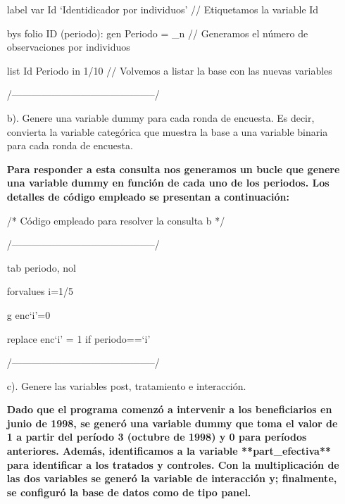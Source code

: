\documentclass[12pt]{article}
\begin{document}
\begin{enumerate}
\begin{statacode}
label var Id `Identidicador por individuos' // Etiquetamos la variable Id

bys folio ID (periodo): gen Periodo = \_n   // Generamos el número de observaciones por individuos

list  Id Periodo in 1/10 // Volvemos a listar la base con las nuevas variables

/--------------------------------------------/
\end{statacode}
 
\begin{stlog}\end{stlog}

\vspace{0.5cm}
\item [b).] Genere una variable dummy para cada ronda de encuesta. Es decir, convierta la variable categórica que muestra la base a una variable binaria para cada ronda de encuesta. 

\textbf{Para responder a esta consulta nos generamos un bucle que genere una variable dummy en función de cada uno de los periodos. Los detalles de código empleado se presentan a continuación: }

\begin{statacode}
/* Código empleado para resolver la consulta b */ 

/--------------------------------------------/


tab periodo, nol

forvalues i=1/5 {
    
    g enc`i'=0
	
	replace enc`i' = 1 if periodo==`i'
	
}



/--------------------------------------------/
\end{statacode}
 


\item [c).] Genere las variables post, tratamiento e interacción. 

\textbf{Dado que el programa comenzó a intervenir a los beneficiarios en junio de 1998, se generó una variable dummy que toma el valor de 1 a partir del período 3 (octubre de 1998) y 0 para períodos anteriores. Además, identificamos a la variable **part\_efectiva** para identificar a los tratados y controles. Con la multiplicación de las dos variables se generó la variable de interacción y; finalmente, se configuró la base de datos como de tipo panel.}


\end{enumerate}
\end{document}
